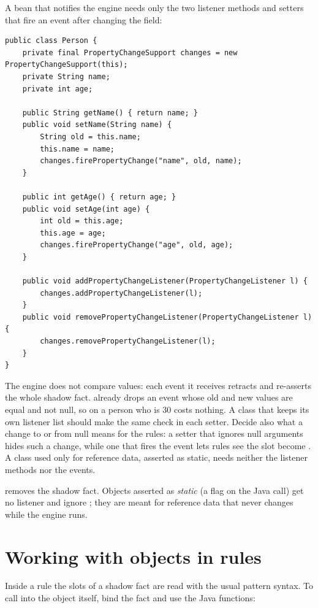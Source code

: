 A bean that notifies the engine needs only the two listener methods and
setters that fire an event after changing the field:

\begin{lstlisting}[style=java]
public class Person {
    private final PropertyChangeSupport changes = new PropertyChangeSupport(this);
    private String name;
    private int age;

    public String getName() { return name; }
    public void setName(String name) {
        String old = this.name;
        this.name = name;
        changes.firePropertyChange("name", old, name);
    }

    public int getAge() { return age; }
    public void setAge(int age) {
        int old = this.age;
        this.age = age;
        changes.firePropertyChange("age", old, age);
    }

    public void addPropertyChangeListener(PropertyChangeListener l) {
        changes.addPropertyChangeListener(l);
    }
    public void removePropertyChangeListener(PropertyChangeListener l) {
        changes.removePropertyChangeListener(l);
    }
}
\end{lstlisting}

The engine does not compare values: each event it receives retracts and
re-asserts the whole shadow fact.  already
drops an event whose old and new values are equal and not null, so
 on a person who is 30 costs nothing. A class that keeps
its own listener list should make the same check in each setter. Decide
also what a change to or from null means for the rules: a setter that
ignores null arguments hides such a change, while one that fires the
event lets rules see the slot become . A class used only for
reference data, asserted as static, needs neither the listener methods
nor the events.

 removes the shadow fact. Objects asserted
as \emph{static} (a flag on the Java  call) get no
listener and ignore ; they are meant for reference data
that never changes while the engine runs.

\section{Working with objects in rules}

Inside a rule the slots of a shadow fact are read with the usual pattern
syntax. To call into the object itself, bind the fact and use the Java
functions:

